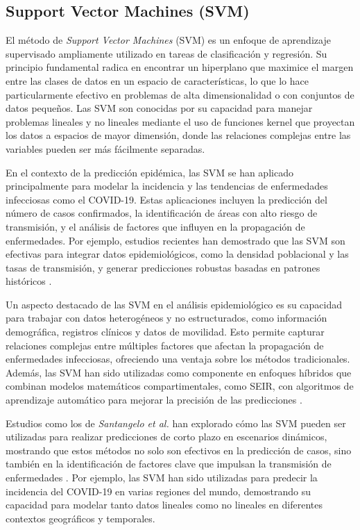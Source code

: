 \subsection{Support Vector Machines (SVM)}

El método de \textit{Support Vector Machines} (SVM) es un enfoque de aprendizaje supervisado ampliamente utilizado en tareas de clasificación y regresión. Su principio fundamental radica en encontrar un hiperplano que maximice el margen entre las clases de datos en un espacio de características, lo que lo hace particularmente efectivo en problemas de alta dimensionalidad o con conjuntos de datos pequeños. Las SVM son conocidas por su capacidad para manejar problemas lineales y no lineales mediante el uso de funciones kernel que proyectan los datos a espacios de mayor dimensión, donde las relaciones complejas entre las variables pueden ser más fácilmente separadas.

En el contexto de la predicción epidémica, las SVM se han aplicado principalmente para modelar la incidencia y las tendencias de enfermedades infecciosas como el COVID-19. Estas aplicaciones incluyen la predicción del número de casos confirmados, la identificación de áreas con alto riesgo de transmisión, y el análisis de factores que influyen en la propagación de enfermedades. Por ejemplo, estudios recientes han demostrado que las SVM son efectivas para integrar datos epidemiológicos, como la densidad poblacional y las tasas de transmisión, y generar predicciones robustas basadas en patrones históricos \cite{MachineLearningReview2023, Baccega2024}.

Un aspecto destacado de las SVM en el análisis epidemiológico es su capacidad para trabajar con datos heterogéneos y no estructurados, como información demográfica, registros clínicos y datos de movilidad. Esto permite capturar relaciones complejas entre múltiples factores que afectan la propagación de enfermedades infecciosas, ofreciendo una ventaja sobre los métodos tradicionales. Además, las SVM han sido utilizadas como componente en enfoques híbridos que combinan modelos matemáticos compartimentales, como SEIR, con algoritmos de aprendizaje automático para mejorar la precisión de las predicciones \cite{AutoSEIR2020, MachineLearningReview2023}.

Estudios como los de \textit{Santangelo et al.} han explorado cómo las SVM pueden ser utilizadas para realizar predicciones de corto plazo en escenarios dinámicos, mostrando que estos métodos no solo son efectivos en la predicción de casos, sino también en la identificación de factores clave que impulsan la transmisión de enfermedades \cite{Santangelo2023}. Por ejemplo, las SVM han sido utilizadas para predecir la incidencia del COVID-19 en varias regiones del mundo, demostrando su capacidad para modelar tanto datos lineales como no lineales en diferentes contextos geográficos y temporales.

